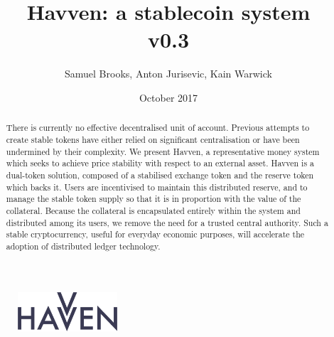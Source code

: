 \documentclass{article}
\begin{document}
\newcommand{\CUR}{\textsc{cur}}
\newcommand{\NOM}{\textsc{nom}}


\title{Havven: a stablecoin system\\ v0.3}
\author{Samuel Brooks, Anton Jurisevic, Kain Warwick}
\date{October 2017}


\begin{figure}
    \centering
    \includegraphics[width=0.33\textwidth]{img/havvenlogo}
\end{figure}
\maketitle

\hfill

\begin{abstract}
\noindent There is currently no effective decentralised unit of account. Previous attempts to create
stable tokens have either relied on significant centralisation or have been undermined by their
complexity. We present Havven, a representative money system which seeks to achieve price
stability with respect to an external asset. Havven is a dual-token solution, composed of a
stabilised exchange token and the reserve token which backs it. Users are incentivised to maintain
this distributed reserve, and to manage the stable token supply so that it is in proportion with the
value of the collateral. Because the collateral is encapsulated entirely within the system and
distributed among its users, we remove the need for a trusted central authority.
Such a stable cryptocurrency, useful for everyday economic purposes, will accelerate the adoption of
distributed ledger technology.
\end{abstract}


\listoftodos{}

\pagebreak










\end{document}
